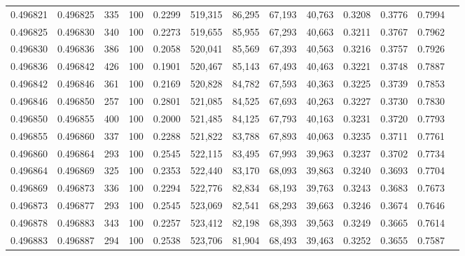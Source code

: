\begin{tabular}{rrrrrrrrrrrrr}
0.496821 & 0.496825 &   335 & 100 &                                     0.2299 & 519,315 &  86,295 &  67,193 &  40,763 & 0.3208 & 0.3776 & 0.7994 \\
0.496825 & 0.496830 &   340 & 100 &                                     0.2273 & 519,655 &  85,955 &  67,293 &  40,663 & 0.3211 & 0.3767 & 0.7962 \\
0.496830 & 0.496836 &   386 & 100 &                                     0.2058 & 520,041 &  85,569 &  67,393 &  40,563 & 0.3216 & 0.3757 & 0.7926 \\
0.496836 & 0.496842 &   426 & 100 &                                     0.1901 & 520,467 &  85,143 &  67,493 &  40,463 & 0.3221 & 0.3748 & 0.7887 \\
0.496842 & 0.496846 &   361 & 100 &                                     0.2169 & 520,828 &  84,782 &  67,593 &  40,363 & 0.3225 & 0.3739 & 0.7853 \\
0.496846 & 0.496850 &   257 & 100 &                                     0.2801 & 521,085 &  84,525 &  67,693 &  40,263 & 0.3227 & 0.3730 & 0.7830 \\
0.496850 & 0.496855 &   400 & 100 &                                     0.2000 & 521,485 &  84,125 &  67,793 &  40,163 & 0.3231 & 0.3720 & 0.7793 \\
0.496855 & 0.496860 &   337 & 100 &                                     0.2288 & 521,822 &  83,788 &  67,893 &  40,063 & 0.3235 & 0.3711 & 0.7761 \\
0.496860 & 0.496864 &   293 & 100 &                                     0.2545 & 522,115 &  83,495 &  67,993 &  39,963 & 0.3237 & 0.3702 & 0.7734 \\
0.496864 & 0.496869 &   325 & 100 &                                     0.2353 & 522,440 &  83,170 &  68,093 &  39,863 & 0.3240 & 0.3693 & 0.7704 \\
0.496869 & 0.496873 &   336 & 100 &                                     0.2294 & 522,776 &  82,834 &  68,193 &  39,763 & 0.3243 & 0.3683 & 0.7673 \\
0.496873 & 0.496877 &   293 & 100 &                                     0.2545 & 523,069 &  82,541 &  68,293 &  39,663 & 0.3246 & 0.3674 & 0.7646 \\
0.496878 & 0.496883 &   343 & 100 &                                     0.2257 & 523,412 &  82,198 &  68,393 &  39,563 & 0.3249 & 0.3665 & 0.7614 \\
0.496883 & 0.496887 &   294 & 100 &                                     0.2538 & 523,706 &  81,904 &  68,493 &  39,463 & 0.3252 & 0.3655 & 0.7587 \\

\end{tabular}
